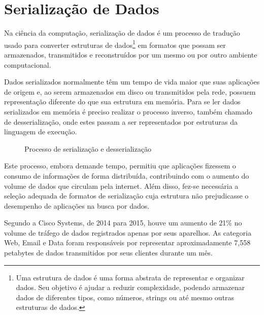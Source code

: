 \section[Serialização de Dados]{Serialização de Dados}

Na ciência da computação, serialização de dados é um processo de tradução usado para converter estruturas de dados\footnote{
  Uma estrutura de dados é uma forma abstrata de representar e organizar dados. Seu objetivo é ajudar a reduzir complexidade, podendo armazenar dados de diferentes tipos, como números, strings ou até mesmo outras estruturas de dados.
} em formatos que possam ser armazenados, transmitidos e reconstruídos por um mesmo ou por outro ambiente computacional. \cite{Cline2016}

Dados serializados normalmente têm um tempo de vida maior que suas aplicações de origem e, ao serem armazenados em disco ou transmitidos pela rede, possuem representação diferente do que sua estrutura em memória. Para se ler dados serializados em memória é preciso realizar o processo inverso, também chamado de desserialização, onde estes passam a ser representados por estruturas da linguagem de execução. \cite{Guller2016}
  
\begin{figure}[H]
  \centering
  \caption{Processo de serialização e desserialização}
\end{figure}

Este processo, embora demande tempo, permitiu que aplicações fizessem o consumo de informações de forma distribuída, contribuindo com o aumento do volume de dados que circulam pela internet. Além disso, fez-se necessária a seleção adequada de formatos de serialização cuja estrutura não prejudicasse o desempenho de aplicações na busca por dados. \cite{SumarayMakki2012}

Segundo a Cisco Systems, de 2014 para 2015, houve um aumento de 21\% no volume de tráfego de dados registrados apenas por seus aparelhos. As categoria Web, Email e Data foram responsáveis por representar aproximadamente 7,558 petabytes de dados transmitidos por seus clientes durante um mês. \cite{Cisco2016}

